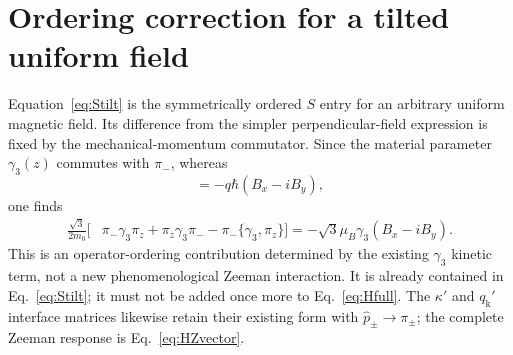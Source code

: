 \documentclass[10pt,letterpaper]{article}
\begin{document}
\section{Ordering correction for a tilted uniform field}
\label{app:tilted}

Equation~\eqref{eq:Stilt} is the symmetrically ordered $S$ entry for an arbitrary uniform magnetic field. Its difference from the simpler perpendicular-field expression is fixed by the mechanical-momentum commutator. Since the material parameter $\gamma_3(z)$ commutes with $\pi_-$, whereas
\begin{equation}
[\pi_z,\pi_-]=-q\hbar(B_x-iB_y),
\label{eq:tiltcommutator}
\end{equation}
one finds
\begin{equation}
\begin{aligned}
\frac{\sqrt3}{2m_0}\bigl[
&\pi_-\gamma_3\pi_z+\pi_z\gamma_3\pi_-
-\pi_-\{\gamma_3,\pi_z\}\bigr]
=-\sqrt3\mu_B\gamma_3(B_x-iB_y).
\end{aligned}
\label{eq:Stiltdifference}
\end{equation}
This is an operator-ordering contribution determined by the existing $\gamma_3$ kinetic term, not a new phenomenological Zeeman interaction. It is already contained in Eq.~\eqref{eq:Stilt}; it must not be added once more to Eq.~\eqref{eq:Hfull}. The $\kappa'$ and $q_{\mathrm k}'$ interface matrices likewise retain their existing form with $ \hat{p}_ \pm\to\pi_\pm$; the complete Zeeman response is Eq.~\eqref{eq:HZvector}.
\end{document}
